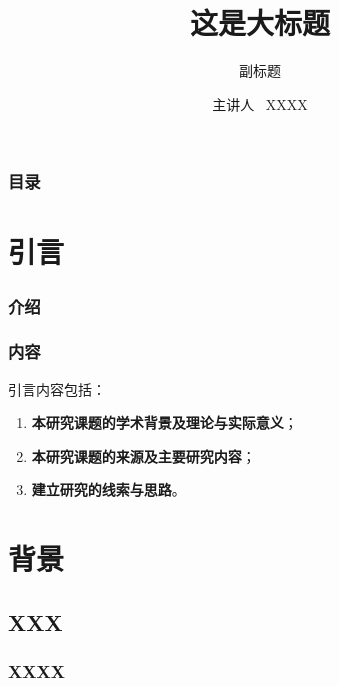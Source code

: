 \documentclass[AutoFakeBold,AutoFakeSlant]{beamer}
\title[这里修改为你的课题（建议与标题一致）]{
  这是大标题} %
\subtitle{副标题} %
\institute[Sun Yat-Sen University]{
  中山大学 \\ 物理与天文学院
  }
\date[\today]{\ctoday}
\begin{document}
\author[netid@mail2.sysu.edu.cn]{
  主讲人  \ XXXX
  \texorpdfstring{\\}{XXX}
}

\begin{frame}
  \titlepage
\end{frame}
\setcounter{framenumber}{0}

\begin{frame}
  \frametitle{目\quad 录}
  \tableofcontents[hideallsubsections]
\end{frame}

\section{引言}

\begin{frame}
  \frametitle{介绍}

\end{frame}

\begin{frame}
  \frametitle{内容}

  引言内容包括：
  \begin{enumerate}
    \item \textbf{本研究课题的学术背景及理论与实际意义}；
    \item \textbf{本研究课题的来源及主要研究内容}；
    \item \textbf{建立研究的线索与思路}。
  \end{enumerate}

\end{frame}

\section{背景}

\subsection{XXX}

\begin{frame}
  \frametitle{XXXX}

\end{frame}
\end{document}
